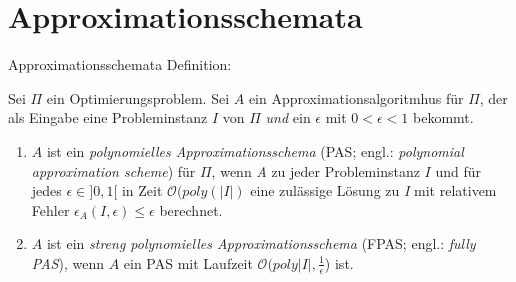 \section{Approximationsschemata}

\begin{frame}{Approximationsschemata}	
    Definition:
			
Sei $\Pi$ ein Optimierungsproblem. Sei $A$ ein Approximationsalgoritmhus für $\Pi$, der als Eingabe eine Probleminstanz $I$ von $\Pi$ \textit{und} ein $\epsilon$ mit $0 < \epsilon < 1$ bekommt.

\begin{enumerate}
\item
$A$ ist ein \textit{polynomielles Approximationsschema} (PAS; engl.: \textit{polynomial approximation scheme}) für $\Pi$, wenn \textit{A} zu jeder Probleminstanz $I$ und für jedes $\epsilon \in ] 0,1 [$ in Zeit $\mathcal O(poly(|I|)$ eine zulässige Lösung zu \textit{I} mit relativem Fehler $\epsilon_A(\textit{I},\epsilon) \leqslant \epsilon$ berechnet.

\item
$A$ ist ein \textit{streng polynomielles Approximationsschema} (FPAS; engl.: \textit{fully PAS}), wenn $A$ ein PAS mit Laufzeit $\mathcal O(poly|I|, \frac{1}{\epsilon}$) ist.

\end{enumerate}		      
\end{frame}
